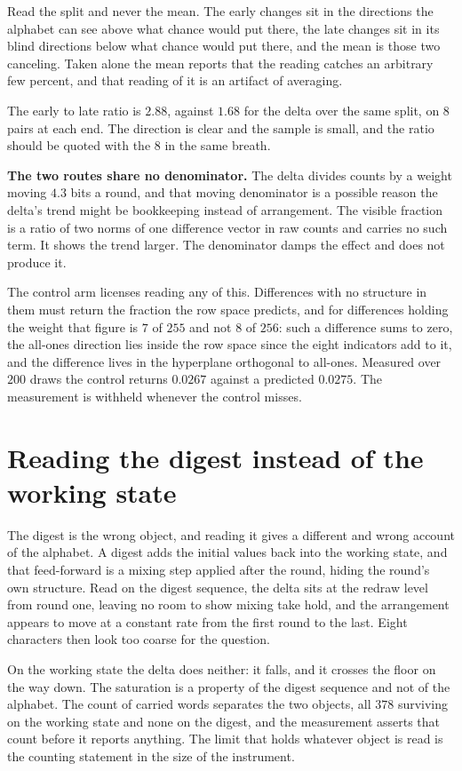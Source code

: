 Read the split and never the mean. The early changes sit in the directions the alphabet can see above what chance would put there, the late changes sit in its blind directions below what chance would put there, and the mean is those two canceling. Taken alone the mean reports that the reading catches an arbitrary few percent, and that reading of it is an artifact of averaging.

The early to late ratio is \(2.88\), against \(1.68\) for the delta over the same split, on \(8\) pairs at each end. The direction is clear and the sample is small, and the ratio should be quoted with the \(8\) in the same breath.

\textbf{The two routes share no denominator.} The delta divides counts by a weight moving \(4.3\) bits a round, and that moving denominator is a possible reason the delta's trend might be bookkeeping instead of arrangement. The visible fraction is a ratio of two norms of one difference vector in raw counts and carries no such term. It shows the trend larger. The denominator damps the effect and does not produce it.

The control arm licenses reading any of this. Differences with no structure in them must return the fraction the row space predicts, and for differences holding the weight that figure is \(7\) of \(255\) and not \(8\) of \(256\): such a difference sums to zero, the all-ones direction lies inside the row space since the eight indicators add to it, and the difference lives in the hyperplane orthogonal to all-ones. Measured over \(200\) draws the control returns \(0.0267\) against a predicted \(0.0275\). The measurement is withheld whenever the control misses.

\section{Reading the digest instead of the working state}

The digest is the wrong object, and reading it gives a different and wrong account of the alphabet. A digest adds the initial values back into the working state, and that feed-forward is a mixing step applied after the round, hiding the round's own structure. Read on the digest sequence, the delta sits at the redraw level from round one, leaving no room to show mixing take hold, and the arrangement appears to move at a constant rate from the first round to the last. Eight characters then look too coarse for the question.

On the working state the delta does neither: it falls, and it crosses the floor on the way down. The saturation is a property of the digest sequence and not of the alphabet. The count of carried words separates the two objects, all \(378\) surviving on the working state and none on the digest, and the measurement asserts that count before it reports anything. The limit that holds whatever object is read is the counting statement in the size of the instrument.

